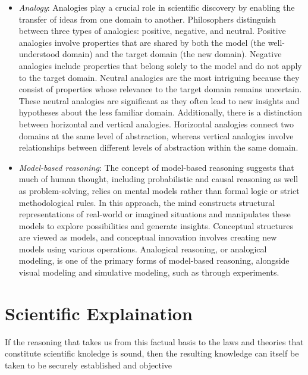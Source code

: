 \begin{itemize}

\item \emph{Analogy}: Analogies play a crucial role in scientific discovery by enabling the transfer of ideas from one domain to another. Philosophers distinguish between three types of analogies: positive, negative, and neutral. Positive analogies involve properties that are shared by both the model (the well-understood domain) and the target domain (the new domain). Negative analogies include properties that belong solely to the model and do not apply to the target domain. Neutral analogies are the most intriguing because they consist of properties whose relevance to the target domain remains uncertain. These neutral analogies are significant as they often lead to new insights and hypotheses about the less familiar domain. Additionally, there is a distinction between horizontal and vertical analogies. Horizontal analogies connect two domains at the same level of abstraction, whereas vertical analogies involve relationships between different levels of abstraction within the same domain.

\item \emph{Model-based reasoning}: The concept of model-based reasoning suggests that much of human thought, including probabilistic and causal reasoning as well as problem-solving, relies on mental models rather than formal logic or strict methodological rules. In this approach, the mind constructs structural representations of real-world or imagined situations and manipulates these models to explore possibilities and generate insights. Conceptual structures are viewed as models, and conceptual innovation involves creating new models using various operations. Analogical reasoning, or analogical modeling, is one of the primary forms of model-based reasoning, alongside visual modeling and simulative modeling, such as through experiments.

\end{itemize}

%
%

\section{Scientific Explaination}

{\color{red} If the reasoning that takes us from this factual basis to the laws and theories that constitute scientific knoledge is sound, then the resulting knowledge can itself be taken to be securely established and objective }


